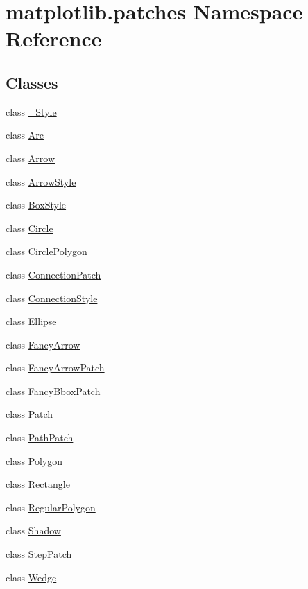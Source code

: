 \hypertarget{namespacematplotlib_1_1patches}{}\section{matplotlib.\+patches Namespace Reference}
\label{namespacematplotlib_1_1patches}
\subsection*{Classes}
\begin{DoxyCompactItemize}
\item 
class \hyperlink{classmatplotlib_1_1patches_1_1__Style}{\+\_\+\+Style}
\item 
class \hyperlink{classmatplotlib_1_1patches_1_1Arc}{Arc}
\item 
class \hyperlink{classmatplotlib_1_1patches_1_1Arrow}{Arrow}
\item 
class \hyperlink{classmatplotlib_1_1patches_1_1ArrowStyle}{Arrow\+Style}
\item 
class \hyperlink{classmatplotlib_1_1patches_1_1BoxStyle}{Box\+Style}
\item 
class \hyperlink{classmatplotlib_1_1patches_1_1Circle}{Circle}
\item 
class \hyperlink{classmatplotlib_1_1patches_1_1CirclePolygon}{Circle\+Polygon}
\item 
class \hyperlink{classmatplotlib_1_1patches_1_1ConnectionPatch}{Connection\+Patch}
\item 
class \hyperlink{classmatplotlib_1_1patches_1_1ConnectionStyle}{Connection\+Style}
\item 
class \hyperlink{classmatplotlib_1_1patches_1_1Ellipse}{Ellipse}
\item 
class \hyperlink{classmatplotlib_1_1patches_1_1FancyArrow}{Fancy\+Arrow}
\item 
class \hyperlink{classmatplotlib_1_1patches_1_1FancyArrowPatch}{Fancy\+Arrow\+Patch}
\item 
class \hyperlink{classmatplotlib_1_1patches_1_1FancyBboxPatch}{Fancy\+Bbox\+Patch}
\item 
class \hyperlink{classmatplotlib_1_1patches_1_1Patch}{Patch}
\item 
class \hyperlink{classmatplotlib_1_1patches_1_1PathPatch}{Path\+Patch}
\item 
class \hyperlink{classmatplotlib_1_1patches_1_1Polygon}{Polygon}
\item 
class \hyperlink{classmatplotlib_1_1patches_1_1Rectangle}{Rectangle}
\item 
class \hyperlink{classmatplotlib_1_1patches_1_1RegularPolygon}{Regular\+Polygon}
\item 
class \hyperlink{classmatplotlib_1_1patches_1_1Shadow}{Shadow}
\item 
class \hyperlink{classmatplotlib_1_1patches_1_1StepPatch}{Step\+Patch}
\item 
class \hyperlink{classmatplotlib_1_1patches_1_1Wedge}{Wedge}
\end{DoxyCompactItemize}
